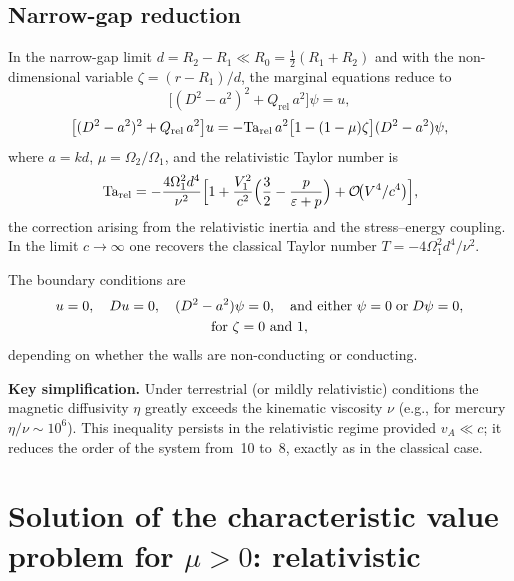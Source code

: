 \subsection{Narrow-gap reduction}
\label{sec:rel-87-narrowgap}

In the narrow-gap limit $d = R_2 - R_1 \ll R_0 = \tfrac{1}{2}(R_1+R_2)$
and with the non-dimensional variable $\zeta = (r-R_1)/d$, the marginal
equations reduce to
\begin{equation}
  \bigl[(D^2-a^2)^2 + Q_{\mathrm{rel}}\,a^2\bigr]\psi = u,
  \label{eq:rel-9-194R}
\end{equation}
\begin{equation}
  \bigl[(D^2-a^2)^2 + Q_{\mathrm{rel}}\,a^2\bigr]u
  = -\mathrm{Ta}_{\mathrm{rel}}\,a^2
    \bigl[1-(1-\mu)\zeta\bigr](D^2-a^2)\psi,
  \label{eq:rel-9-195R}
\end{equation}
where $a = kd$, $\mu = \Omega_2/\Omega_1$, and the relativistic Taylor
number is
\begin{equation}
  \mathrm{Ta}_{\mathrm{rel}} = -\frac{4\Omega_1^2 d^4}{\nu^2}
    \Bigl[1 + \frac{V_1^2}{c^2}
      \Bigl(\frac{3}{2}-\frac{p}{\varepsilon+p}\Bigr)
      + \mathcal{O}\!\bigl(V^4/c^4\bigr)\Bigr],
  \label{eq:rel-9-Tarel}
\end{equation}
the correction arising from the relativistic inertia and the
stress--energy coupling.  In the limit $c\to\infty$ one recovers the
classical Taylor number $T = -4\Omega_1^2 d^4/\nu^2$.

The boundary conditions are
\begin{gather}
  u = 0,\quad Du = 0,\quad (D^2-a^2)\psi = 0,
  \quad\text{and either } \psi = 0 \;\text{or}\; D\psi = 0,
  \notag\\
  \text{for } \zeta = 0 \text{ and } 1,
  \label{eq:rel-9-197R}
\end{gather}
depending on whether the walls are non-conducting or conducting.

\medskip
\noindent\textbf{Key simplification.}
Under terrestrial (or mildly relativistic) conditions the magnetic
diffusivity $\eta$ greatly exceeds the kinematic viscosity $\nu$
(e.g., for mercury $\eta/\nu \sim 10^6$).  This inequality persists in
the relativistic regime provided $v_A \ll c$; it reduces the order of
the system from~10 to~8, exactly as in the classical case.

\section{Solution of the characteristic value problem for $\mu > 0$:
  relativistic}
\label{sec:rel-88}

